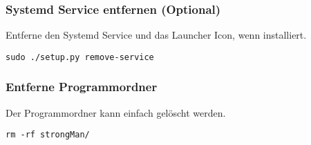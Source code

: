 \subsubsection{Systemd Service entfernen (Optional)}
Entferne den Systemd Service und das Launcher Icon, wenn installiert.
\begin{lstlisting}[style=BashInputStyle]
    sudo ./setup.py remove-service
\end{lstlisting}

\subsubsection{Entferne Programmordner}
Der Programmordner kann einfach gelöscht werden.
\begin{lstlisting}[style=BashInputStyle]
    rm -rf strongMan/
\end{lstlisting}

